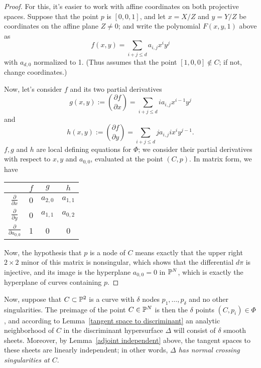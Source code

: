 \begin{proof}
For this, it's easier to work with affine coordinates on both projective spaces. Suppose that the point $p$ is $[0,0,1]$, and let $x = X/Z$ and $y = Y/Z$ be coordinates on the affine plane $Z \neq 0$; and write the polynomial $F(x,y,1)$ above as
$$
f(x,y) = \sum_{i+j \leq d} a_{i,j} x^iy^j
$$
with $a_{d,0}$ normalized to 1. (Thus assumes that the point $[1,0,0] \notin C$; if not, change coordinates.)

Now, let's consider $f$ and its two partial derivatives  
$$
g(x,y) := \binom{\partial f}{\partial x} = \sum_{i+j \leq d} i a_{i,j} x^{i-1}y^j
$$
and
$$
h(x,y) := \binom{\partial f}{\partial y} = \sum_{i+j \leq d} j a_{i,j} ix^{i}y^{j-1}.
$$
$f, g$ and $h$ are local defining equations for $\Phi$; we consider their partial derivatives with respect to $x, y$ and $a_{0,0}$, evaluated at the point $(C,p)$. In matrix form, we have

\begin{table}[h!]
  \begin{center}
     \begin{tabular}{c|c|c|c} %
            & $f$ & $g$ & $h$ \\
      \hline
$\frac{\partial}{\partial x}$ & 0 & $a_{2,0}$ & $a_{1,1}$ \\
$\frac{\partial}{\partial y}$ & 0 & $a_{1,1}$ & $a_{0,2}$ \\
$\frac{\partial}{\partial a_{0,0}}$ & 1 & 0 & 0 
    \end{tabular}
  \end{center}
\end{table}

Now, the hypothesis that $p$ is a node of $C$ means exactly that the upper right $2 \times 2$ minor of this matrix is nonsingular, which shows that the differential $d\pi$ is injective, and its image is the hyperplane $a_{0,0} = 0$ in ${\mathbb P}^N$, which is exactly the hyperplane of curves containing $p$.
\end{proof}

Now, suppose that $C \subset {\mathbb P}^2$ is a curve with $\delta$ nodes $p_1,\dots,p_\delta$ and no other singularities. The preimage of the point $C \in {\mathbb P}^N$ is then the $\delta$ points $(C,p_i) \in \Phi$, and according to  Lemma~\ref{tangent space to discriminant} an analytic neighborhood of $C$ in the discriminant hypersurface $\Delta$ will consist of $\delta$ smooth sheets. Moreover, by Lemma~\ref{adjoint independent} above, the tangent spaces to these sheets are linearly independent; in other words, \emph{$\Delta$ has normal crossing singularities at $C$}.

